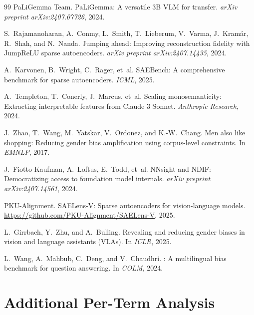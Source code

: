 \documentclass[11pt,a4paper]{article}
\begin{document}
\begin{thebibliography}{99}
PaLiGemma Team.
\newblock PaLiGemma: A versatile 3B VLM for transfer.
\newblock \emph{arXiv preprint arXiv:2407.07726}, 2024.

S.~Rajamanoharan, A.~Conmy, L.~Smith, T.~Lieberum, V.~Varma, J.~Kramár, R.~Shah, and N.~Nanda.
\newblock Jumping ahead: Improving reconstruction fidelity with JumpReLU sparse autoencoders.
\newblock \emph{arXiv preprint arXiv:2407.14435}, 2024.

A.~Karvonen, B.~Wright, C.~Rager, et~al.
\newblock SAEBench: A comprehensive benchmark for sparse autoencoders.
\newblock \emph{ICML}, 2025.

A.~Templeton, T.~Conerly, J.~Marcus, et~al.
\newblock Scaling monosemanticity: Extracting interpretable features from Claude 3 Sonnet.
\newblock \emph{Anthropic Research}, 2024.

J.~Zhao, T.~Wang, M.~Yatskar, V.~Ordonez, and K.-W.~Chang.
\newblock Men also like shopping: Reducing gender bias amplification using corpus-level constraints.
\newblock In \emph{EMNLP}, 2017.

J.~Fiotto-Kaufman, A.~Loftus, E.~Todd, et~al.
\newblock NNsight and NDIF: Democratizing access to foundation model internals.
\newblock \emph{arXiv preprint arXiv:2407.14561}, 2024.

PKU-Alignment.
\newblock SAELens-V: Sparse autoencoders for vision-language models.
\newblock \url{https://github.com/PKU-Alignment/SAELens-V}, 2025.

L.~Girrbach, Y.~Zhu, and A.~Bulling.
\newblock Revealing and reducing gender biases in vision and language assistants ({VLAs}).
\newblock In \emph{ICLR}, 2025.

L.~Wang, A.~Mahbub, C.~Deng, and V.~Chaudhri.
: A multilingual bias benchmark for question answering.
\newblock In \emph{COLM}, 2024.

\end{thebibliography}

\appendix
\section{Additional Per-Term Analysis}
\label{app:per_term}
\end{document}
